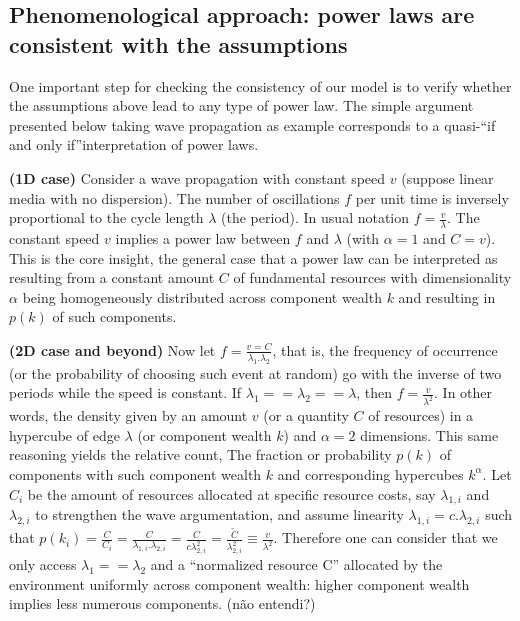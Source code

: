 \documentclass[a4paper, 11pt]{article} %
\begin{document}
\subsection{Phenomenological approach: power laws are consistent with the assumptions}\label{sec:phen}

One important step for checking the consistency of our model is to verify whether the assumptions above lead to any type of power law. The simple argument presented below taking wave propagation as example corresponds to a quasi-``if and only if''interpretation of power laws.

{\bf (1D case)} Consider a wave propagation with constant speed $v$ 
(suppose linear media with no dispersion). The number of oscillations $f$ per unit time is inversely proportional to the cycle length $\lambda$ (the period). In usual notation $f=\frac{v}{\lambda}$.
The constant speed $v$ implies a power law between 
$f$ and $\lambda$ (with $\alpha=1$ and $C=v$).
This is the core insight, the general case that a power law can
be interpreted as resulting from a constant amount $C$ of
fundamental resources with dimensionality $\alpha$ 
being homogeneously distributed across
component wealth $k$ and 
resulting in $p(k)$ of such components.

{\bf (2D case and beyond)} Now let $f=\frac{v=C}{\lambda_1 . \lambda_2}$, that is, the frequency of occurrence
(or the probability of choosing such event at random) go with the inverse of two periods while the speed is constant. 
If $\lambda_1==\lambda_2==\lambda$, then $f=\frac{v}{\lambda^2}$.
In other words, the density given by an amount $v$
(or a quantity $C$ of resources) in a hypercube of
edge $\lambda$ (or component wealth $k$)
and $\alpha=2$ dimensions.
This same reasoning yields the relative count,
The fraction or probability $p(k)$ of components with such component wealth $k$ and corresponding hypercubes $k^\alpha$.
Let $C_i$ be the amount of resources allocated at
specific resource costs, say $\lambda_{1,i}$ and $\lambda_{2,i}$ to strengthen the wave argumentation,
and assume linearity $\lambda_{1,i}=c.\lambda_{2,i}$
such that
$p(k_i)=\frac{C}{C_i}=\frac{C}{\lambda_{1,i}.\lambda_{2,i}}=
\frac{C}{c\lambda_{2,i}^2}=\frac{\widetilde{C}}{\lambda_{2,i}^2}\equiv\frac{v}{\lambda^2}$.
Therefore one can consider that we only access $\lambda_1==\lambda_2$ and a ``normalized resource C'' allocated by the environment uniformly across component wealth:
higher component wealth implies less numerous components. (não entendi?) 
\end{document}
